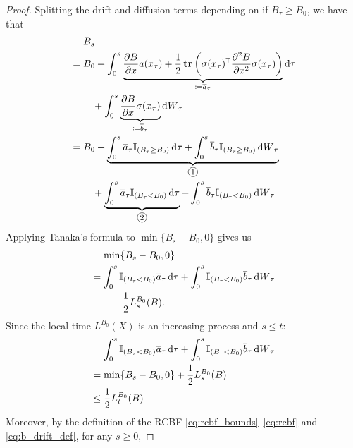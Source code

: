 \documentclass[twocolumn,amsthm]{autart}
\newcommand{\T}{^\mathsf{T}}
\DeclareMathOperator{\Tr}{\mathbf{tr}}
\newcommand*\circled[1]{\tikz[baseline=(char.base)]{
    \node[shape=circle,draw,inner sep=1pt] (char) {#1};}}
\begin{document}
\begin{proof}
    Splitting the drift and diffusion terms depending on if $B_\tau \geq B_0$, we have that
    \begin{align}
        &\mathrel{\phantom{=}} B_s \notag \\
        &\begin{aligned}[t]
        &= B_0 + \int_0^s \underbrace{\frac{\partial B}{\partial x} a(x_\tau)
        + \frac{1}{2}\Tr\left(\sigma(x_\tau)\T \frac{\partial^2 B}{\partial x^2} \sigma(x_\tau) \right)}_{\coloneqq \overline{a}_\tau} \dd{\tau} \\
        &\hphantom{= B_0} + \int_0^s \underbrace{\frac{\partial B}{\partial x}\sigma(x_\tau)}_{\coloneqq \overline{b}_\tau} \dd{W}_\tau
        \end{aligned} \\
&= B_0 + \underbrace{\int_0^s \overline{a}_\tau \mathbb{I}_{(B_\tau \geq B_0)} \dd{\tau} + \int_0^s \overline{b}_\tau \mathbb{I}_{(B_\tau \geq B_0)} \dd{W}_\tau}_{\circled{\footnotesize 1}} \notag \\
        &\hphantom{= B_0} + \underbrace{\int_0^s \overline{a}_\tau \mathbb{I}_{(B_\tau < B_0)} \dd{\tau}}_{\circled{\footnotesize 2}} + \int_0^s \overline{b}_\tau \mathbb{I}_{(B_\tau < B_0)} \dd{W}_\tau
    \end{align}
Applying Tanaka's formula  to $\min\{ B_s - B_0, 0 \}$ gives us
\begin{equation}
    \begin{split}
    &\mathrel{\phantom{=}} \min\{ B_s - B_0, 0 \} \\
&= \int_0^s \mathbb{I}_{(B_\tau < B_0)} \overline{a}_\tau \dd{\tau} + \int_0^s \mathbb{I}_{(B_\tau < B_0)} \overline{b}_\tau \dd{W}_\tau \\
    &\qquad - \frac{1}{2} L_s^{B_0}(B).
    \end{split}
    \raisetag{1.2\baselineskip}
\end{equation}
Since the local time $L^{B_0}(X)$ is an increasing process and $s \leq t$:
\begin{align}
&\mathrel{\phantom{=}} \int_0^s \mathbb{I}_{(B_\tau < B_0)} \overline{a}_\tau \dd{\tau} + \int_0^s \mathbb{I}_{(B_\tau < B_0)} \overline{b}_\tau \dd{W}_\tau \notag \\
    &= \min\{ B_s - B_0, 0 \} + \frac{1}{2} L_s^{B_0}(B) \\
    &\leq \frac{1}{2} L_t^{B_0}(B) \label{eq:local_time_bound}
\end{align}
Moreover, by the definition of the RCBF \eqref{eq:rcbf_bounds}--\eqref{eq:rcbf} and \eqref{eq:b_drift_def}, for any $s \geq 0$,

\end{proof}
\end{document}
